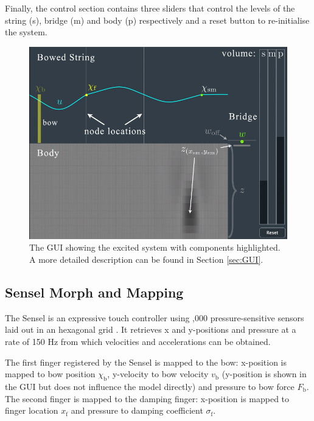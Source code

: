 \documentclass[dvipsnames, pdftex]{article}
\def\SBcomment[#1]{\textcolor{Red}{#1}}
\def\SWcomment[#1]{\textcolor{Bittersweet}{#1}}
\def\stringx{\chi}
\begin{document}
Finally, the control section contains three sliders that control the levels of the string (s), bridge (m) and body (p) respectively and a reset button to re-initialise the system. 
\begin{figure}[h]
  \centering
  \includegraphics[width=1.0\columnwidth]{applicationDescription.pdf}
  \caption{The GUI showing the excited system with components highlighted. A more detailed description can be found in Section \ref{sec:GUI}. %
  }
  \label{fig:GUI}
\end{figure}

\subsection{Sensel Morph and Mapping}
The Sensel is an expressive touch controller using ,000 pressure-sensitive sensors laid out in an hexagonal grid \cite{sensel2020}. It retrieves x and y-positions and pressure at a rate of 150 Hz from which velocities and accelerations can be obtained.

The first finger registered by the Sensel is mapped to the bow: x-position is mapped to bow position $\stringx_\text{b}$, y-velocity to bow velocity $v_\text{b}$ (y-position is shown in the GUI but does not influence the model directly) and pressure to bow force $F_\text{b}$. The second finger is mapped to the damping finger: x-position is mapped to finger location $x_\text{f}$ and pressure to damping coefficient $\sigma_\text{f}$.
\end{document}

